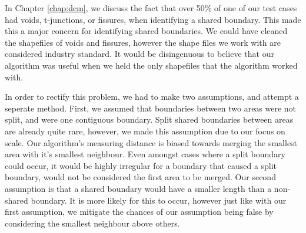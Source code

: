 In Chapter \ref{chap:dcm}, we discuss the fact that over 50\% of one of our test cases had voids, t-junctions, or fissures, when identifying a shared boundary. This made this a major concern for identifying shared boundaries. We could have cleaned the shapefiles of voids and fissures, however the shape files we work with are considered industry standard. It would be disingenuous to believe that our algorithm was useful when we held the only shapefiles that the algorithm worked with.

In order to rectify this problem, we had to make two assumptions, and attempt a seperate method.
First, we assumed that boundaries between two areas were not split, and were one contiguous boundary. Split shared boundaries between areas are already quite rare, however, we made this assumption due to our focus on scale. Our algorithm's measuring distance is biased towards merging the smallest area with it's smallest neighbour. Even amongst cases where a split boundary could occur, it would be highly irregular for a boundary that caused a split boundary, would not be considered the first area to be merged. 
Our second assumption is that a shared boundary would have a smaller length than a non-shared boundary. It is more likely for this to occur, however just like with our first assumption, we mitigate the chances of our assumption being false by considering the smallest neighbour above others.
